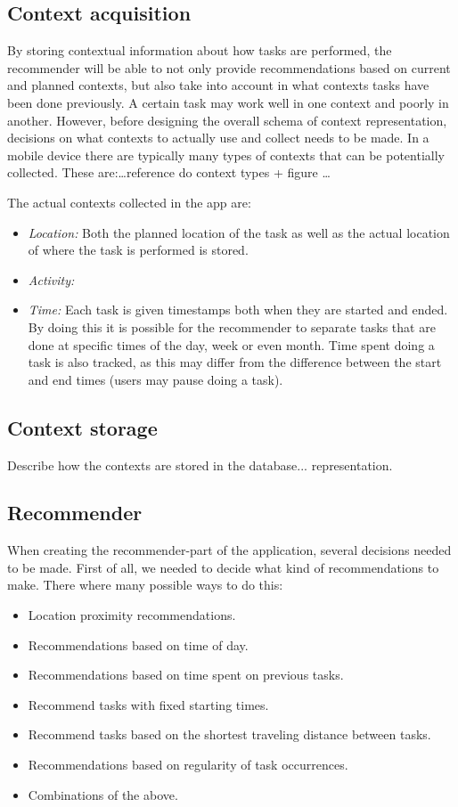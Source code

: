 \subsection{Context acquisition}
By storing contextual information about how tasks are performed, the recommender will be able to not only provide recommendations based on current and planned contexts, but also take into account in what contexts tasks have been done previously. A certain task may work well in one context and poorly in another. However, before designing the overall schema of context representation, decisions on what contexts to actually use and collect needs to be made. In a mobile device there are typically many types of contexts that can be potentially collected. These are:\ldots reference do context types + figure \ldots

The actual contexts collected in the app are:
\begin{itemize}
	\item \emph{Location:} Both the planned location of the task as well as the actual location of where the task is performed is stored.
	\item \emph{Activity:} 
	\item \emph{Time:} Each task is given timestamps both when they are started and ended. By doing this it is possible for the recommender to separate tasks that are done at specific times of the day, week or even month. Time spent doing a task is also tracked, as this may differ from the difference between the start and end times (users may pause doing a task).
\end{itemize}


\subsection{Context storage}
Describe how the contexts are stored in the database... representation.


\subsection{Recommender}

When creating the recommender-part of the application, several decisions needed to be made. First of all, we needed to decide what kind of recommendations to make. There where many possible ways to do this:
\begin{itemize}
	\item Location proximity recommendations.
  \item Recommendations based on time of day.
  \item Recommendations based on time spent on previous tasks.
  \item Recommend tasks with fixed starting times.
  \item Recommend tasks based on the shortest traveling distance between tasks.
  \item Recommendations based on regularity of task occurrences.
  \item Combinations of the above.
\end{itemize}


